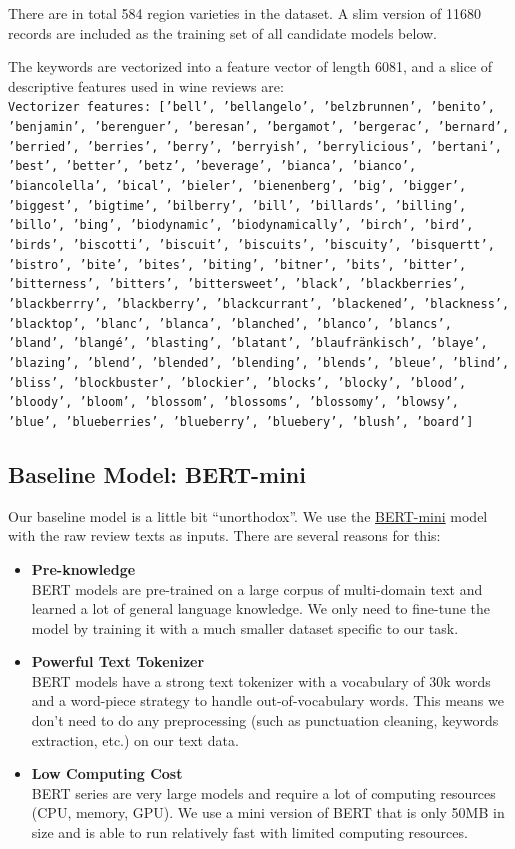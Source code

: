 \documentclass[
]{kaohandt}
\begin{document}
There are in total 584 region varieties in the dataset. A slim version of 11680 records are included as the training set of all candidate models below.

The keywords are vectorized into a feature vector of length 6081, and a slice of descriptive features used in wine reviews are: \\

\texttt{Vectorizer features: ['bell', 'bellangelo', 'belzbrunnen', 'benito', 'benjamin', 'berenguer', 'beresan', 'bergamot', 'bergerac', 'bernard', 'berried', 'berries', 'berry', 'berryish', 'berrylicious', 'bertani', 'best', 'better', 'betz', 'beverage', 'bianca', 'bianco', 'biancolella', 'bical', 'bieler', 'bienenberg', 'big', 'bigger', 'biggest', 'bigtime', 'bilberry', 'bill', 'billards', 'billing', 'billo', 'bing', 'biodynamic', 'biodynamically', 'birch', 'bird', 'birds', 'biscotti', 'biscuit', 'biscuits', 'biscuity', 'bisquertt', 'bistro', 'bite', 'bites', 'biting', 'bitner', 'bits', 'bitter', 'bitterness', 'bitters', 'bittersweet', 'black', 'blackberries', 'blackberrry', 'blackberry', 'blackcurrant', 'blackened', 'blackness', 'blacktop', 'blanc', 'blanca', 'blanched', 'blanco', 'blancs', 'bland', 'blangé', 'blasting', 'blatant', 'blaufränkisch', 'blaye', 'blazing', 'blend', 'blended', 'blending', 'blends', 'bleue', 'blind', 'bliss', 'blockbuster', 'blockier', 'blocks', 'blocky', 'blood', 'bloody', 'bloom', 'blossom', 'blossoms', 'blossomy', 'blowsy', 'blue', 'blueberries', 'blueberry', 'bluebery', 'blush', 'board']}

\subsection*{Baseline Model: BERT-mini}

Our baseline model is a little bit “unorthodox”. We use the \href{https://huggingface.co/google/bert_uncased_L-4_H-256_A-4}{BERT-mini} model with the raw review texts as inputs. There are several reasons for this:

\begin{itemize}
	\item \textbf{Pre-knowledge} \\
	BERT models are pre-trained on a large corpus of multi-domain text and learned a lot of general language knowledge. We only need to fine-tune the model by training it with a much smaller dataset specific to our task.
	\item \textbf{Powerful Text Tokenizer} \\
	BERT models have a strong text tokenizer with a vocabulary of 30k words and a word-piece strategy to handle out-of-vocabulary words. This means we don’t need to do any preprocessing (such as punctuation cleaning, keywords extraction, etc.) on our text data.
	\item \textbf{Low Computing Cost} \\
	BERT series are very large models and require a lot of computing resources (CPU, memory, GPU). We use a mini version of BERT that is only 50MB in size and is able to run relatively fast with limited computing resources.
\end{itemize}
\end{document}
